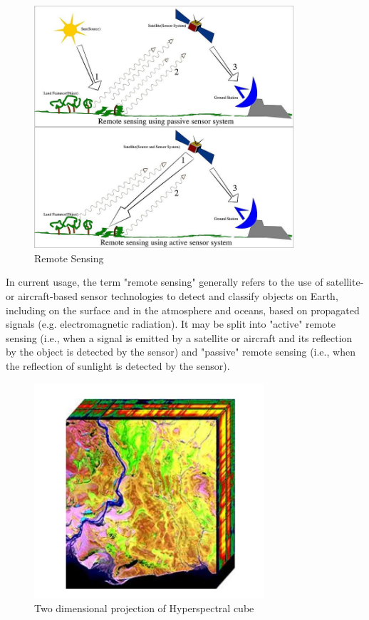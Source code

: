 \documentclass[document.tex]{subfiles}
\begin{document}
\begin{figure}[H]
	\begin{center}
		\includegraphics[height=9.0cm]{imgs/Remote_Sensing.jpg}
	\end{center}
	\caption{Remote Sensing}
	\label{fig: Remote Sensing}
\end{figure}

\noindent In current usage, the term "remote sensing" generally refers to the use of satellite- or aircraft-based sensor technologies to detect and classify objects on Earth, including on the surface and in the atmosphere and oceans, based on propagated signals (e.g. electromagnetic radiation). It may be split into "active" remote sensing (i.e., when a signal is emitted by a satellite or aircraft and its reflection by the object is detected by the sensor) and "passive" remote sensing (i.e., when the reflection of sunlight is detected by the sensor).
\begin{figure}[H]
	\begin{center}
		\includegraphics[height=8.0cm]{imgs/cube.png}
	\end{center}
	\caption{Two dimensional projection
		of Hyperspectral cube}
	\label{Two dimensional projection
		of Hyperspectral cube}
\end{figure}
\end{document}
